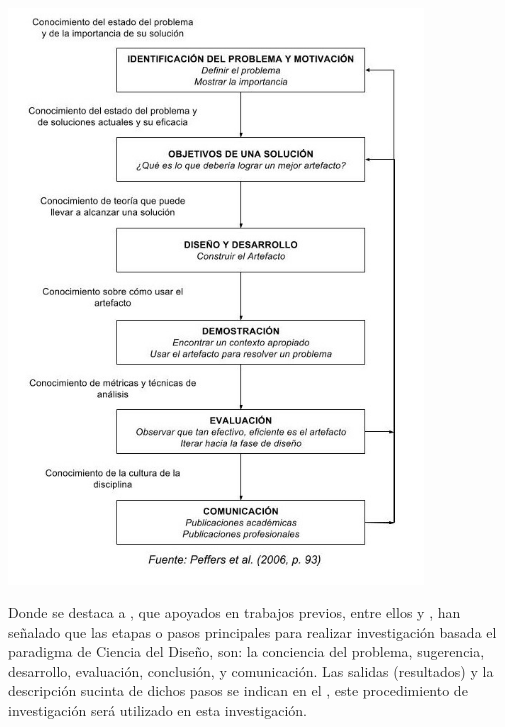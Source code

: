 \begin{grafico}[titulo = Un modelo para producir y presentar investigación en ciencias del diseño, etiqueta=graficoMetodologia]
\includegraphics[width=11cm]{graficas/modeloMetodo.jpg}
\end{grafico}
Donde se destaca a \citet[pp. 1127-1128]{dresch2014design}, que apoyados en trabajos previos, entre ellos \citet{vaishnavi2015design} y \citet[p. 56]{peffers2006design}, han señalado que las etapas o pasos principales para realizar investigación basada el paradigma de Ciencia del Diseño, son: la conciencia del problema, sugerencia, desarrollo, evaluación, conclusión, y comunicación. Las salidas (resultados) y la descripción sucinta de dichos pasos se indican en el , este procedimiento de investigación será utilizado en esta investigación.
